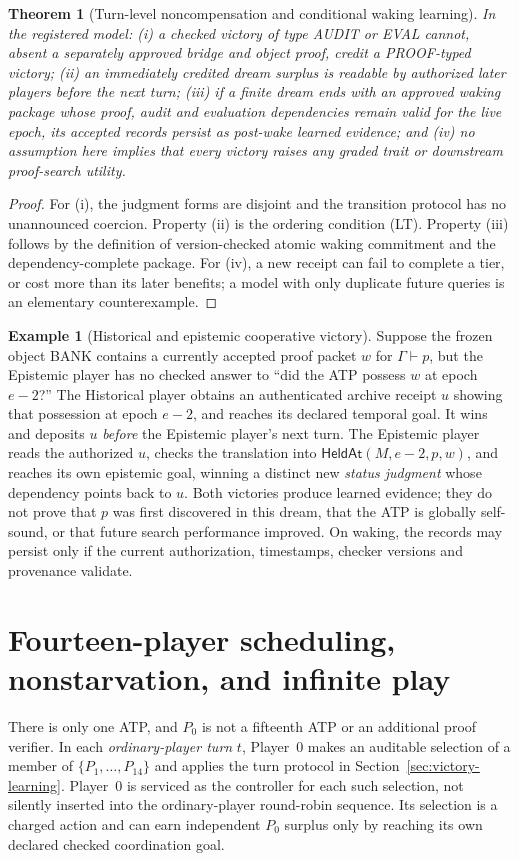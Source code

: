 \documentclass[11pt,letterpaper]{article}
\theoremstyle{definition}
\theoremstyle{plain}
\newtheorem{theorem}[definition]{Theorem}
\theoremstyle{definition}
\newtheorem{example}[definition]{Example}
\begin{document}
\begin{theorem}[Turn-level noncompensation and conditional waking learning]
In the registered model: (i) a checked victory of type \textsf{AUDIT} or \textsf{EVAL} cannot, absent a separately approved bridge and object proof, credit a \textsf{PROOF}-typed victory; (ii) an immediately credited dream surplus is readable by authorized later players before the next turn; (iii) if a finite dream ends with an approved waking package whose proof, audit and evaluation dependencies remain valid for the live epoch, its accepted records persist as post-wake learned evidence; and (iv) no assumption here implies that every victory raises any graded trait or downstream proof-search utility.
\end{theorem}
\begin{proof}
For (i), the judgment forms are disjoint and the transition protocol has no unannounced coercion. Property (ii) is the ordering condition (LT). Property (iii) follows by the definition of version-checked atomic waking commitment and the dependency-complete package. For (iv), a new receipt can fail to complete a tier, or cost more than its later benefits; a model with only duplicate future queries is an elementary counterexample.
\end{proof}

\begin{example}[Historical and epistemic cooperative victory]
Suppose the frozen object BANK contains a currently accepted proof packet $w$ for $\Gamma\vdash p$, but the Epistemic player has no checked answer to ``did the ATP possess $w$ at epoch $e-2$?'' The Historical player obtains an authenticated archive receipt $u$ showing that possession at epoch $e-2$, and reaches its declared temporal goal. It wins and deposits $u$ \emph{before} the Epistemic player's next turn. The Epistemic player reads the authorized $u$, checks the translation into \(\mathsf{HeldAt}(M,e-2,p,w)\), and reaches its own epistemic goal, winning a distinct new \emph{status judgment} whose dependency points back to $u$. Both victories produce learned evidence; they do not prove that $p$ was first discovered in this dream, that the ATP is globally self-sound, or that future search performance improved. On waking, the records may persist only if the current authorization, timestamps, checker versions and provenance validate.
\end{example}


\section{Fourteen-player scheduling, nonstarvation, and infinite play}\label{gl-first-W0-s4}
\label{sec:fairness14}
There is only one ATP, and $P_0$ is not a fifteenth ATP or an additional proof verifier. In each \emph{ordinary-player turn} $t$, Player~0 makes an auditable selection of a member of $\{P_1,\ldots,P_{14}\}$ and applies the turn protocol in Section~\ref{sec:victory-learning}. Player~0 is serviced as the controller for each such selection, not silently inserted into the ordinary-player round-robin sequence. Its selection is a charged action and can earn independent $P_0$ surplus only by reaching its own declared checked coordination goal.
\end{document}
